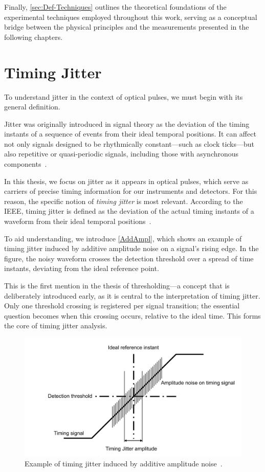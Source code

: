 Finally, \autoref{sec:Def-Techniques} outlines the theoretical foundations of the experimental techniques employed throughout this work, serving as a conceptual bridge between the physical principles and the measurements presented in the following chapters.

\section{Timing Jitter}
\label{Sec:Def-Jitter}

To understand jitter in the context of optical pulses, we must begin with its general definition.

Jitter was originally introduced in signal theory as the deviation of the timing instants of a sequence of events from their ideal temporal positions. It can affect not only signals designed to be rhythmically constant—such as clock ticks—but also repetitive or quasi-periodic signals, including those with asynchronous components~\cite{General_IEEE}.

In this thesis, we focus on jitter as it appears in optical pulses, which serve as carriers of precise timing information for our instruments and detectors. For this reason, the specific notion of \emph{timing jitter} is most relevant. According to the IEEE, timing jitter is defined as the deviation of the actual timing instants of a waveform from their ideal temporal positions~\cite{General_IEEE}.

To aid understanding, we introduce \autoref{AddAmpl}, which shows an example of timing jitter induced by additive amplitude noise on a signal’s rising edge. In the figure, the noisy waveform crosses the detection threshold over a spread of time instants, deviating from the ideal reference point.

This is the first mention in the thesis of thresholding—a concept that is deliberately introduced early, as it is central to the interpretation of timing jitter. Only one threshold crossing is registered per signal transition; the essential question becomes when this crossing occurs, relative to the ideal time. This forms the core of timing jitter analysis.

\begin{figure}[hbtp]
\centering
\includegraphics[width=1\textwidth]{AmplitudeAdditiveNoise}
\caption{Example of timing jitter induced by additive amplitude noise~\cite{General_IEEE}.}
\label{AddAmpl}
\end{figure}

